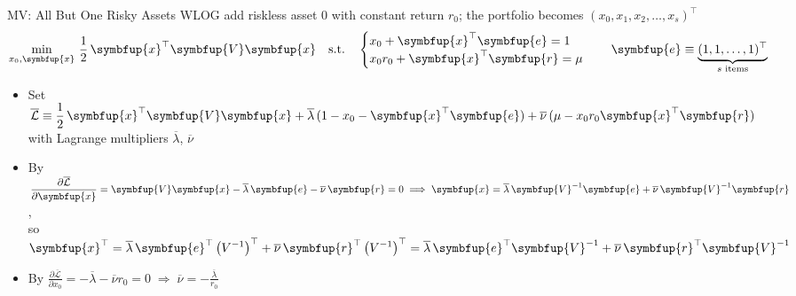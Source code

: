 \documentclass[10pt,handout]{beamer}
\newcommand{\ds}{\displaystyle}
\newcommand{\ie}{\;\Longrightarrow\;}
\newcommand{\vx}{\symbfup{x}}
\newcommand{\vV}{\symbfup{V}}
\newcommand{\ve}{\symbfup{e}}
\newcommand{\vr}{\symbfup{r}}
\theoremstyle{definition}
\begin{document}
\begin{frame}{MV: All But One Risky Assets}
\onslide<+->
\noindent WLOG add riskless asset $0$ with constant return $r_0$; the portfolio becomes $(x_0, x_1, x_2, \ldots, x_s)^\top$ 
\onslide<+->
\begin{align*}
  \min_{x_0, \vx}\,\frac{1}{2}\,\vx^\top\vV\vx\quad\text{s.t.}\quad\begin{cases} x_0 + \vx^\top\ve = 1 \\ x_0 r_0 + \vx^\top\vr = \mu\end{cases}\quad\ve\equiv\underbrace{(1, 1, \ldots, 1)^\top}_{\text{$s$ items}}
\end{align*}
\begin{itemize}[<+->]
  \item Set $\ds\overline{\mathcal{L}}\equiv\frac{1}{2}\,\vx^\top\vV\vx + \overline{\lambda}\,(1 - x_0 - \vx^\top\ve) + \overline{\nu}\,(\mu - x_0 r_0 \vx^\top\vr)$ with Lagrange multipliers $\overline{\lambda}$, $\overline{\nu}$
  \item By $\ds\frac{\partial\overline{\mathcal{L}}}{\partial\vx} = \vV\vx - \overline{\lambda}\,\ve - \overline{\nu}\,\vr = 0\ie\vx = \overline{\lambda}\,\vV^{-1}\ve + \overline{\nu}\,\vV^{-1}\vr$, \\ so $\ds\vx^\top = \overline{\lambda}\,\ve^\top\left(V^{-1}\right)^\top + \overline{\nu}\,\vr^\top\left(V^{-1}\right)^\top = \overline{\lambda}\,\ve^\top\vV^{-1} + \overline{\nu}\,\vr^\top\vV^{-1}$
  \item By $\ds\frac{\partial\overline{\mathcal{L}}}{\partial x_0} = -\overline{\lambda} - \overline{\nu}r_0 = 0\ie\overline{\nu} = -\frac{\overline{\lambda}}{r_0}$
\end{itemize}

\end{frame}
\end{document}
